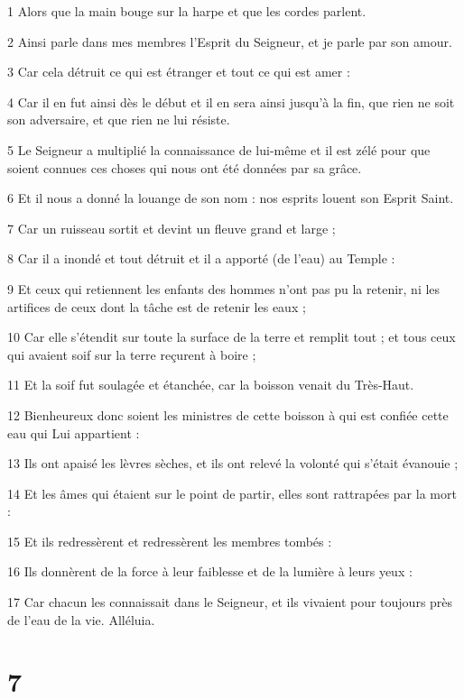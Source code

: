 \par 1 Alors que la main bouge sur la harpe et que les cordes parlent.
\par 2 Ainsi parle dans mes membres l'Esprit du Seigneur, et je parle par son amour.
\par 3 Car cela détruit ce qui est étranger et tout ce qui est amer :
\par 4 Car il en fut ainsi dès le début et il en sera ainsi jusqu'à la fin, que rien ne soit son adversaire, et que rien ne lui résiste.
\par 5 Le Seigneur a multiplié la connaissance de lui-même et il est zélé pour que soient connues ces choses qui nous ont été données par sa grâce.
\par 6 Et il nous a donné la louange de son nom : nos esprits louent son Esprit Saint.
\par 7 Car un ruisseau sortit et devint un fleuve grand et large ;
\par 8 Car il a inondé et tout détruit et il a apporté (de l'eau) au Temple :
\par 9 Et ceux qui retiennent les enfants des hommes n'ont pas pu la retenir, ni les artifices de ceux dont la tâche est de retenir les eaux ;
\par 10 Car elle s'étendit sur toute la surface de la terre et remplit tout ; et tous ceux qui avaient soif sur la terre reçurent à boire ;
\par 11 Et la soif fut soulagée et étanchée, car la boisson venait du Très-Haut.
\par 12 Bienheureux donc soient les ministres de cette boisson à qui est confiée cette eau qui Lui appartient :
\par 13 Ils ont apaisé les lèvres sèches, et ils ont relevé la volonté qui s'était évanouie ;
\par 14 Et les âmes qui étaient sur le point de partir, elles sont rattrapées par la mort :
\par 15 Et ils redressèrent et redressèrent les membres tombés :
\par 16 Ils donnèrent de la force à leur faiblesse et de la lumière à leurs yeux :
\par 17 Car chacun les connaissait dans le Seigneur, et ils vivaient pour toujours près de l'eau de la vie. Alléluia.



\chapter{7}

